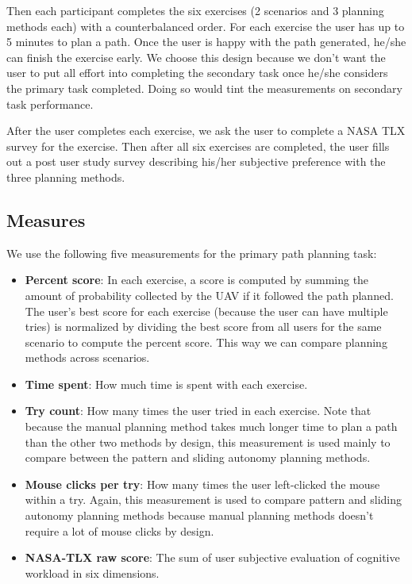 \documentclass[journal]{IEEEtran}
\begin{document}
Then each participant completes the six exercises (2 scenarios and 3 planning methods each) with a counterbalanced order. For each exercise the user has up to 5 minutes to plan a path. Once the user is happy with the path generated, he/she can finish the exercise early. We choose this design because we don't want the user to put all effort into completing the secondary task once he/she considers the primary task completed. Doing so would tint the measurements on secondary task performance.

After the user completes each exercise, we ask the user to complete a NASA TLX survey for the exercise. Then after all six exercises are completed, the user fills out a post user study survey describing his/her subjective preference with the three planning methods.

\subsection{Measures}

We use the following five measurements for the primary path planning task:

\begin{itemize}
\item \textbf{Percent score}: In each exercise, a score is computed by summing the amount of probability collected by the UAV if it followed the path planned. The user's best score for each exercise (because the user can have multiple tries) is normalized by dividing the best score from all users for the same scenario to compute the percent score. This way we can compare planning methods across scenarios.
\item \textbf{Time spent}: How much time is spent with each exercise.
\item \textbf{Try count}: How many times the user tried in each exercise. Note that because the manual planning method takes much longer time to plan a path than the other two methods by design, this measurement is used mainly to compare between the pattern and sliding autonomy planning methods.
\item \textbf{Mouse clicks per try}: How many times the user left-clicked the mouse within a try. Again, this measurement is used to compare pattern and sliding autonomy planning methods because manual planning methods doesn't require a lot of mouse clicks by design.
\item \textbf{NASA-TLX raw score}: The sum of user subjective evaluation of cognitive workload in six dimensions. 
\end{itemize}
\end{document}
